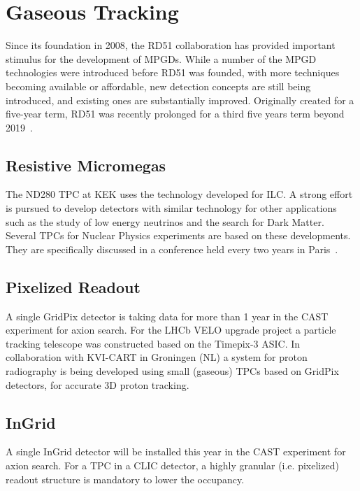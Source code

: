 \section{Gaseous Tracking}
Since its foundation in 2008, the RD51 collaboration has provided important stimulus for the development of MPGDs. While a number of the MPGD technologies were introduced before RD51 was founded, with more techniques becoming available or affordable, new detection concepts are still being introduced, and existing ones are substantially improved. Originally created for a five-year term, RD51 was recently prolonged for a third five years term beyond 2019~\cite{DallaTorre:2018ttn,RD51Collaboration}. 

\subsection{Resistive Micromegas}
The ND280 TPC at KEK uses the technology developed for ILC.
A strong effort is pursued to develop detectors with similar technology for other applications such as
the study of low energy neutrinos and the search for Dark Matter.
Several TPCs for Nuclear Physics experiments are based on these developments. They are specifically discussed in a
conference held every two years in Paris~\cite{Irastorza:2013mxa}.

\subsection{Pixelized Readout}
A single GridPix detector is taking data for more than 1 year in the CAST
experiment for axion search.
For the LHCb VELO upgrade project a particle tracking telescope was constructed
based on the Timepix-3 ASIC.
In collaboration with KVI-CART in Groningen (NL) a system for proton radiography
is being developed using small (gaseous) TPCs based on GridPix detectors, for
accurate 3D proton tracking.

\subsection{InGrid}
A single InGrid detector will be installed this year in the CAST experiment for axion search. For a TPC in a CLIC detector, a highly granular (i.e. pixelized) readout structure is mandatory to lower the occupancy.

